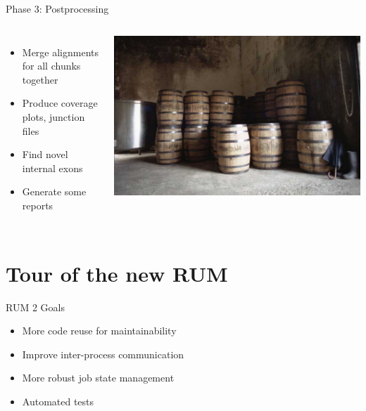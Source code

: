 \documentclass{beamer}
\begin{document}
\begin{frame}{Phase 3: Postprocessing}

  \begin{columns}
    \column{2.5in}
    \begin{itemize}
    \item Merge alignments for all chunks together
    \item Produce coverage plots, junction files
    \item Find novel internal exons
    \item Generate some reports
    \end{itemize} 
    \column{2.5in}
    \includegraphics[scale=0.2]{Rum_in_barrels_at_travellers_distillery.jpg}
  \end{columns}



\end{frame}

\section{Tour of the new RUM}

\begin{frame}{RUM 2 Goals}
  \begin{itemize}
  \item More code reuse for maintainability
  \item Improve inter-process communication
  \item More robust job state management
  \item Automated tests
  \end{itemize}
\end{frame}
\end{document}
